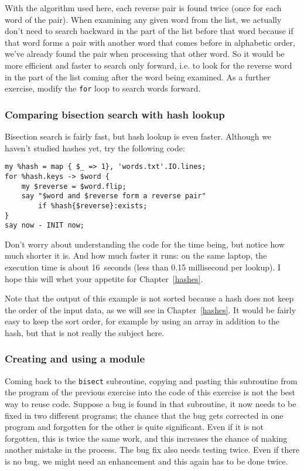 With the algorithm used here, each reverse pair is found 
twice (once for each word of the pair). When examining 
any given word from the list, we actually don't need to 
search backward in the part of the list before that word because 
if that word forms a pair with another word that comes before in 
alphabetic order, we've already found the pair when 
processing that other word. So it would be more efficient and 
faster to search only forward, i.e. to look for the reverse 
word in the part of the list coming after the word being 
examined. As a further exercise, modify the {\tt for} loop 
to search words forward.

\subsubsection{Comparing bisection search with hash lookup}

Bisection search is fairly fast, but hash lookup is 
even faster. Although we haven't studied hashes yet, 
try the following code:

\begin{verbatim}
my %hash = map { $_ => 1}, 'words.txt'.IO.lines;
for %hash.keys -> $word {
    my $reverse = $word.flip;
    say "$word and $reverse form a reverse pair" 
        if %hash{$reverse}:exists;
}
say now - INIT now;
\end{verbatim}

Don't worry about understanding the code for the time 
being, but notice how much shorter it is. And how much 
faster it runs: on the same laptop, the execution time is 
about 16~seconds (less than 0.15 millisecond per lookup). 
I hope this will whet your appetite for Chapter~\ref{hashes}.

Note that the output of this example is not sorted because 
a hash does not keep the order of the input data, as we 
will see in Chapter~\ref{hashes}. It would be fairly easy to 
keep the sort order, for example by using an array in 
addition to the hash, but that is not really the 
subject here.

\subsubsection{Creating and using a module}

\label{bisect_module}
Coming back to the {\tt bisect} subroutine, copying 
and pasting this subroutine from the program of the 
previous exercise into the code of this exercise is 
not the best way to reuse code. Suppose a bug is 
found in that subroutine, it now needs to be fixed 
in two different programs; the chance that the bug gets 
corrected in one program and forgotten for the other 
is quite significant. Even if it is not forgotten, this 
is twice the same work, and this increases the chance 
of making another mistake in the process. The bug fix 
also needs testing twice. Even if there is no bug, we 
might need an enhancement and this again has to be done 
twice. 

